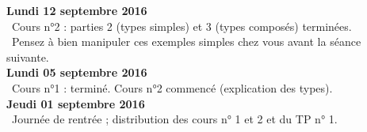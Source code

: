 \documentclass[12pt,a4paper]{article}
\begin{document}
\noindent\textbf{Lundi 12 septembre 2016 }\\
\bu\ Cours n°2 : parties 2 (types simples) et 3 (types composés) terminées. \\
\bu\ Pensez à bien manipuler ces exemples simples chez vous avant la séance suivante. \vspace{.4cm}\\

\noindent\textbf{Lundi 05 septembre 2016 }\\
\bu\ Cours n°1 : terminé. Cours n°2 commencé (explication des types). \vspace{.4cm}\\

\noindent\textbf{Jeudi 01 septembre 2016 }\\
\bu\ Journée de rentrée ; distribution des cours n° 1 et 2 et du TP n° 1. 

\label{end}
\end{document}
